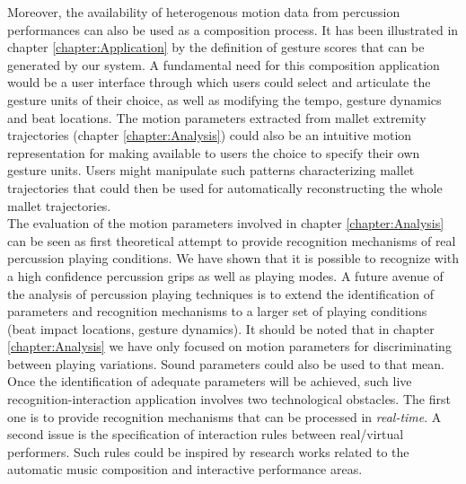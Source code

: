 Moreover, the availability of heterogenous motion data from percussion performances can also be used as a composition process. It has been  illustrated in chapter \ref{chapter:Application} by the definition of gesture scores that can be generated by our system. A fundamental need for this composition application would be a user interface through which users could select and articulate the gesture units of their choice, as well as modifying the tempo, gesture dynamics and beat locations. The motion parameters extracted from mallet extremity trajectories (chapter \ref{chapter:Analysis}) could also be an intuitive motion representation for making available to users the choice to specify their own gesture units. Users might manipulate such patterns characterizing mallet trajectories that could then be used for automatically reconstructing the whole mallet trajectories.\\
 

The evaluation of the motion parameters involved in chapter \ref{chapter:Analysis} can be seen as first theoretical attempt to provide recognition mechanisms of real percussion playing conditions. We have shown that it is possible to recognize with a high confidence percussion grips as well as playing modes. A future avenue of the analysis of percussion playing techniques is to extend the identification of parameters and recognition mechanisms to a larger set of playing conditions (beat impact locations, gesture dynamics). It should be noted that in chapter \ref{chapter:Analysis} we have only focused on motion parameters for discriminating between playing variations. Sound parameters could also be used to that mean. Once the identification of adequate parameters will be achieved, such live recognition-interaction application involves two technological obstacles. The first one is to provide recognition mechanisms that can be processed in \emph{real-time}. A second issue is the specification of interaction rules between real/virtual performers. Such rules could be inspired by research works related to the automatic music composition and interactive performance areas.


